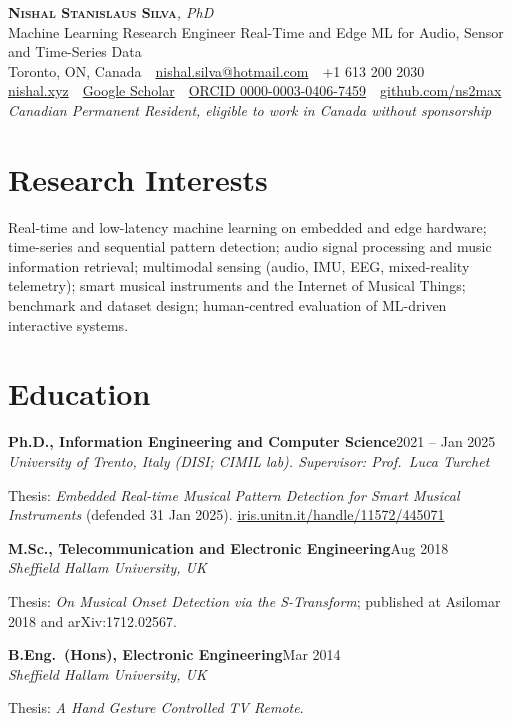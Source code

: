 \documentclass[11pt]{article}
\newcommand{\entry}[3]{%
  \par\noindent\textbf{#1}\hfill #2\\
  \noindent\textit{#3}\par\vspace{0.15em}}
\begin{document}
\begin{center}
  {\LARGE \scshape \textbf{Nishal Stanislaus Silva}}{\large \textit{, PhD}}\\[3pt]
  {\small Machine Learning Research Engineer \textbar{} Real-Time and Edge ML for Audio, Sensor and Time-Series Data}\\[3pt]
  {\small Toronto, ON, Canada \,\textbar\, \href{mailto:nishal.silva@hotmail.com}{nishal.silva@hotmail.com} \,\textbar\, +1 613 200 2030}\\[2pt]
  {\small \href{https://nishal.xyz}{nishal.xyz} \,\textbar\,
  \href{https://scholar.google.com/citations?user=pdintvAAAAAJ}{Google Scholar} \,\textbar\,
  \href{https://orcid.org/0000-0003-0406-7459}{ORCID 0000-0003-0406-7459} \,\textbar\,
  \href{https://github.com/ns2max}{github.com/ns2max}}\\[2pt]
  {\footnotesize\textit{Canadian Permanent Resident, eligible to work in Canada without sponsorship}}
\end{center}

\section*{Research Interests}
Real-time and low-latency machine learning on embedded and edge hardware; time-series and sequential pattern detection; audio signal processing and music information retrieval; multimodal sensing (audio, IMU, EEG, mixed-reality telemetry); smart musical instruments and the Internet of Musical Things; benchmark and dataset design; human-centred evaluation of ML-driven interactive systems.

\section*{Education}
\entry{Ph.D., Information Engineering and Computer Science}{2021 -- Jan 2025}{University of Trento, Italy (DISI; CIMIL lab). Supervisor: Prof.\ Luca Turchet}
\begin{cvlist}
  \item Thesis: \textit{Embedded Real-time Musical Pattern Detection for Smart Musical Instruments} (defended 31 Jan 2025). \href{https://iris.unitn.it/handle/11572/445071}{iris.unitn.it/handle/11572/445071}
\end{cvlist}
\entry{M.Sc., Telecommunication and Electronic Engineering}{Aug 2018}{Sheffield Hallam University, UK}
\begin{cvlist}
  \item Thesis: \textit{On Musical Onset Detection via the S-Transform}; published at Asilomar 2018 and arXiv:1712.02567.
\end{cvlist}
\entry{B.Eng.\ (Hons), Electronic Engineering}{Mar 2014}{Sheffield Hallam University, UK}
\begin{cvlist}
  \item Thesis: \textit{A Hand Gesture Controlled TV Remote}.
\end{cvlist}
\end{document}
